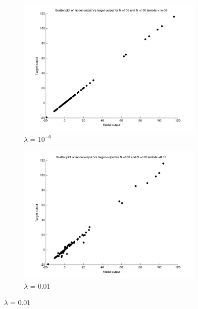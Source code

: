 \documentclass{article}
\begin{document}
\begin{figure}[H]

\begin{subfigure}{.5\textwidth}
\centering
\includegraphics[width=\linewidth]{D2/Scatter/Varyinglambda_N100M100lambda1e-06}
\caption{$\lambda$ = $10^{-6}$}
\end{subfigure}
\begin{subfigure}{.5\textwidth}
\includegraphics[width=\linewidth]{D2/Scatter/Varyinglambda_N100M100lambda0_01}
\caption{$\lambda$ = 0.01}
\end{subfigure}



\end{figure}
\end{document}
